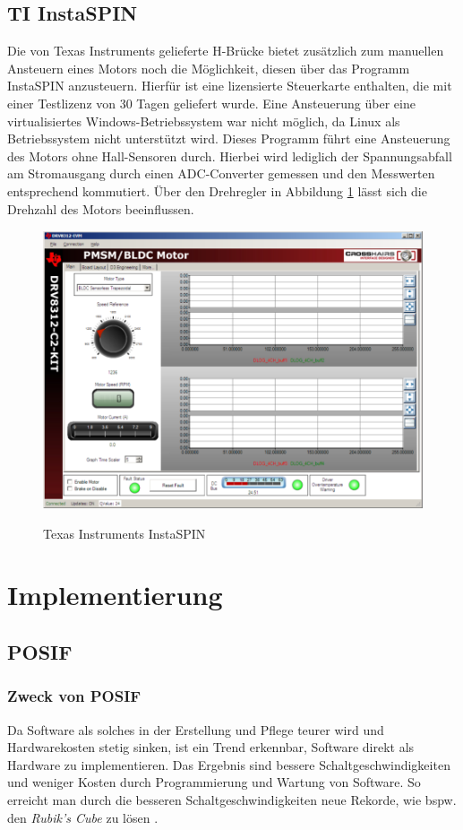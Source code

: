 \subsection{TI InstaSPIN}
Die von Texas Instruments gelieferte H-Brücke bietet zusätzlich zum manuellen Ansteuern eines Motors noch die Möglichkeit, diesen über das Programm InstaSPIN anzusteuern. Hierfür ist eine lizensierte Steuerkarte enthalten, die mit einer Testlizenz von 30 Tagen geliefert wurde. Eine Ansteuerung über eine virtualisiertes Windows-Betriebssystem war nicht möglich, da Linux als Betriebssystem nicht unterstützt wird. Dieses Programm führt eine Ansteuerung des Motors ohne Hall-Sensoren durch. Hierbei wird lediglich der Spannungsabfall am Stromausgang durch einen ADC-Converter gemessen und den Messwerten entsprechend kommutiert. Über den Drehregler in Abbildung \ref{fig:InstaSPIN} lässt sich die Drehzahl des Motors beeinflussen.
\begin{figure}
    \includegraphics[width=\textwidth]{motor/InstaSPIN}
    \caption{Texas Instruments InstaSPIN}
    \quelle \cite{Instruments2011}
    \label{fig:InstaSPIN}
\end{figure}
\section{Implementierung}
\subsection{POSIF}
\subsubsection{Zweck von POSIF}
Da Software als solches in der Erstellung und Pflege teurer wird und Hardwarekosten stetig sinken, ist ein Trend erkennbar, Software direkt als Hardware zu implementieren. Das Ergebnis sind bessere Schaltgeschwindigkeiten und weniger Kosten durch Programmierung und Wartung von Software. So erreicht man durch die besseren Schaltgeschwindigkeiten neue Rekorde, wie bspw. den \emph{Rubik's Cube} zu lösen \cite{POSIF2016}.

